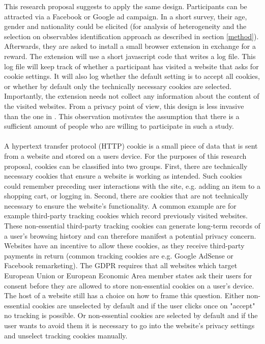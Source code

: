 This research proposal suggests to apply the same design. Participants can be attracted
via a Facebook or Google ad campaign. In a short survey, their age, gender and nationality could
be elicited (for analysis of heterogeneity and the selection on observables identification approach as described in section \ref{method}). Afterwards, they are asked to install a small browser extension in exchange for
a reward. The extension will use a short javascript code that writes a log file. This log file will keep track of whether a participant has 
visited a website that asks for cookie settings. It will also log whether
the default setting is to accept all cookies, or whether by default only the technically necessary cookies are selected.
Importantly, the extension needs not collect any information about the content of the visited websites. From a privacy point of view,
this design is less invasive than the one in \textcite{levy2020}. This observation motivates the assumption that there is a sufficient amount of people who are willing
to participate in such a study.
\\
\\
A hypertext transfer protocol (HTTP) cookie is a small piece of data that is sent from
a website and stored on a users device. For the purposes of this research proposal, cookies can be classified into two groups. First, there are
technically necessary cookies that ensure a website is working as intended. Such cookies could remember preceding user
interactions with the site, e.g. adding an item to a shopping cart, or logging in. Second, there are cookies that are not technically
necessary to ensure the website's functionality. A common example are for example third-party tracking cookies which record previously visited websites.
These non-essential third-party tracking cookies can generate long-term records of a user's browsing history and can therefore manifest a potential privacy concern.
Websites have an incentive to allow these cookies, as they receive third-party payments in return (common tracking cookies are e.g. Google AdSense or Facebook remarketing).  
The GDPR requires that all websites which target European Union or European Economic Area member states ask their users for consent
before they are allowed to store non-essential cookies on a user's device. The host of a website still
has a choice on how to frame this question. Either non-essential cookies are unselected by default and if the
user clicks once on "accept" no tracking is possible. Or non-essential cookies are selected by default and if the user wants
to avoid them it is necessary to go into the website's privacy settings and unselect tracking cookies manually.

